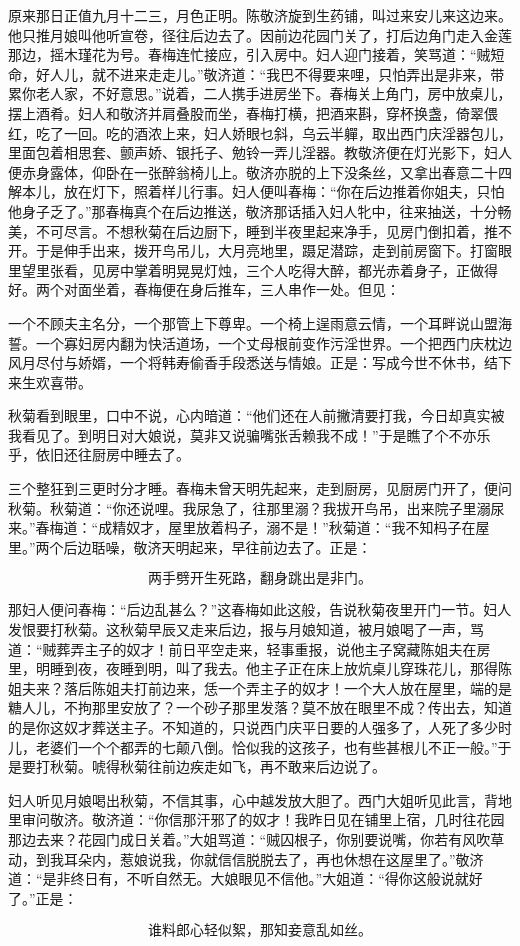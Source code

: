 原来那日正值九月十二三，月色正明。陈敬济旋到生药铺，叫过来安儿来这边来。他只推月娘叫他听宣卷，径往后边去了。因前边花园门关了，打后边角门走入金莲那边，摇木瑾花为号。春梅连忙接应，引入房中。妇人迎门接着，笑骂道：“贼短命，好人儿，就不进来走走儿。”敬济道：“我巴不得要来哩，只怕弄出是非来，带累你老人家，不好意思。”说着，二人携手进房坐下。春梅关上角门，房中放桌儿，摆上酒肴。妇人和敬济并肩叠股而坐，春梅打横，把酒来斟，穿杯换盏，倚翠偎红，吃了一回。吃的酒浓上来，妇人娇眼乜斜，乌云半軃，取出西门庆淫器包儿，里面包着相思套、颤声娇、银托子、勉铃一弄儿淫器。教敬济便在灯光影下，妇人便赤身露体，仰卧在一张醉翁椅儿上。敬济亦脱的上下没条丝，又拿出春意二十四解本儿，放在灯下，照着样儿行事。妇人便叫春梅：“你在后边推着你姐夫，只怕他身子乏了。”那春梅真个在后边推送，敬济那话插入妇人牝中，往来抽送，十分畅美，不可尽言。不想秋菊在后边厨下，睡到半夜里起来净手，见房门倒扣着，推不开。于是伸手出来，拨开鸟吊儿，大月亮地里，蹑足潜踪，走到前房窗下。打窗眼里望里张看，见房中掌着明晃晃灯烛，三个人吃得大醉，都光赤着身子，正做得好。两个对面坐着，春梅便在身后推车，三人串作一处。但见：

一个不顾夫主名分，一个那管上下尊卑。一个椅上逞雨意云情，一个耳畔说山盟海誓。一个寡妇房内翻为快活道场，一个丈母根前变作污淫世界。一个把西门庆枕边风月尽付与娇婿，一个将韩寿偷香手段悉送与情娘。正是：写成今世不休书，结下来生欢喜带。

秋菊看到眼里，口中不说，心内暗道：“他们还在人前撇清要打我，今日却真实被我看见了。到明日对大娘说，莫非又说骗嘴张舌赖我不成！”于是瞧了个不亦乐乎，依旧还往厨房中睡去了。

三个整狂到三更时分才睡。春梅未曾天明先起来，走到厨房，见厨房门开了，便问秋菊。秋菊道：“你还说哩。我尿急了，往那里溺？我拔开鸟吊，出来院子里溺尿来。”春梅道：“成精奴才，屋里放着杩子，溺不是！”秋菊道：“我不知杩子在屋里。”两个后边聒噪，敬济天明起来，早往前边去了。正是：

\[
两手劈开生死路，翻身跳出是非门。
\]

那妇人便问春梅：“后边乱甚么？”这春梅如此这般，告说秋菊夜里开门一节。妇人发恨要打秋菊。这秋菊早辰又走来后边，报与月娘知道，被月娘喝了一声，骂道：“贼葬弄主子的奴才！前日平空走来，轻事重报，说他主子窝藏陈姐夫在房里，明睡到夜，夜睡到明，叫了我去。他主子正在床上放炕桌儿穿珠花儿，那得陈姐夫来？落后陈姐夫打前边来，恁一个弄主子的奴才！一个大人放在屋里，端的是糖人儿，不拘那里安放了？一个砂子那里发落？莫不放在眼里不成？传出去，知道的是你这奴才葬送主子。不知道的，只说西门庆平日要的人强多了，人死了多少时儿，老婆们一个个都弄的七颠八倒。恰似我的这孩子，也有些甚根儿不正一般。”于是要打秋菊。唬得秋菊往前边疾走如飞，再不敢来后边说了。

妇人听见月娘喝出秋菊，不信其事，心中越发放大胆了。西门大姐听见此言，背地里审问敬济。敬济道：“你信那汗邪了的奴才！我昨日见在铺里上宿，几时往花园那边去来？花园门成日关着。”大姐骂道：“贼囚根子，你别要说嘴，你若有风吹草动，到我耳朵内，惹娘说我，你就信信脱脱去了，再也休想在这屋里了。”敬济道：“是非终日有，不听自然无。大娘眼见不信他。”大姐道：“得你这般说就好了。”正是：

\[
谁料郎心轻似絮，那知妾意乱如丝。
\]
